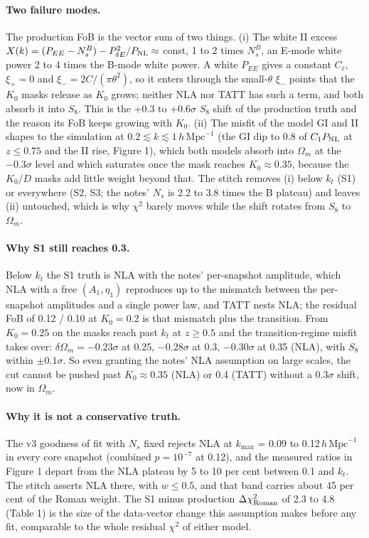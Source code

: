 \documentclass[11pt]{article}
\newcommand{\hmpc}{\,h\,\mathrm{Mpc}^{-1}}
\newcommand{\dchi}{\Delta\chi^2}
\begin{document}
\paragraph{Two failure modes.} The production FoB is the vector sum of two
things. (i) The white II excess $X(k) = (P_{EE} - N_s^{B}) - P_{\delta E}^2/P_{\rm NL}
\approx$ const, 1 to 2 times $N_s^B$, an E-mode white power 2 to 4 times the
B-mode white power. A white $P_{EE}$ gives a constant $C_\ell$, $\xi_+ = 0$
and $\xi_- = 2C/(\pi\theta^2)$, so it enters through the small-$\theta$
$\xi_-$ points that the $K_0$ masks release as $K_0$ grows; neither NLA nor
TATT has such a term, and both absorb it into $S_8$. This is the +0.3 to
+0.6$\sigma$ $S_8$ shift of the production truth and the reason its FoB
keeps growing with $K_0$. (ii) The misfit of the model GI and II shapes to
the simulation at $0.2 \lesssim k \lesssim 1\hmpc$ (the GI dip to 0.8 of
$C_1 P_{\rm NL}$ at $z \le 0.75$ and the II rise, Figure 1), which both
models absorb into $\Omega_m$ at the $-0.3\sigma$ level and which saturates
once the mask reaches $K_0 \approx 0.35$, because the $K_0/D$ masks add
little weight beyond that. The stitch removes (i) below $k_t$ (S1) or
everywhere (S2, S3; the notes' $N_s$ is 2.2 to 3.8 times the B plateau)
and leaves (ii) untouched, which is why $\chi^2$ barely moves while the
shift rotates from $S_8$ to $\Omega_m$.

\paragraph{Why S1 still reaches 0.3.} Below $k_t$ the S1 truth is NLA with
the notes' per-snapshot amplitude, which NLA with a free $(A_1, \eta_1)$
reproduces up to the mismatch between the per-snapshot amplitudes and a
single power law, and TATT nests NLA; the residual FoB of 0.12 / 0.10 at
$K_0 = 0.2$ is that mismatch plus the transition. From $K_0 = 0.25$ on the
masks reach past $k_t$ at $z \ge 0.5$ and the transition-regime misfit
takes over: $\delta\Omega_m = -0.23\sigma$ at 0.25, $-0.28\sigma$ at 0.3,
$-0.30\sigma$ at 0.35 (NLA), with $S_8$ within $\pm 0.1\sigma$. So even
granting the notes' NLA assumption on large scales, the cut cannot be
pushed past $K_0 \approx 0.35$ (NLA) or 0.4 (TATT) without a $0.3\sigma$
shift, now in $\Omega_m$.

\paragraph{Why it is not a conservative truth.} The v3 goodness of fit with
$N_s$ fixed rejects NLA at $k_{\max}$ = 0.09 to 0.12$\hmpc$ in every core
snapshot (combined $p = 10^{-7}$ at 0.12), and the measured ratios in
Figure 1 depart from the NLA plateau by 5 to 10 per cent between 0.1 and
$k_t$. The stitch asserts NLA there, with $w \le 0.5$, and that band
carries about 45 per cent of the Roman weight. The S1 minus production
$\dchi_{\rm Roman}$ of 2.3 to 4.8 (Table 1) is the size of the data-vector
change this assumption makes before any fit, comparable to the whole
residual $\chi^2$ of either model.
\end{document}
